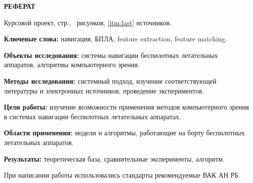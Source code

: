 \begin{center}
  \large\bfseries{РЕФЕРАТ}
\end{center}

Курсовой проект, \pageref{LastPage} стр., \totalfigures\ рисунков, \ref{itm:last} источников.

\begin{center}
  \Large{\@jobtitle}
\end{center}

\textbf{Ключевые слова:} навигация, БПЛА, feature extraction, feature matching.

\textbf{Объекты исследования:} системы навигации беспилотных летательных аппаратов, алгоритмы компьютерного зрения.

\textbf{Методы исследования:} системный подход, изучение соответствующей литературы и электронных источников, проведение экспериментов.

\textbf{Цели работы:} изучение возможности применения методов компьютерного зрения в системах навигации беспилотных летательных аппаратах.

\textbf{Области применения:} модели и алгоритмы, работающие на борту беспилотных летательных аппаратов.

\textbf{Результаты:} теоретическая база, сравнительные эксперименты, алгоритм. 

При написании работы использовались стандарты рекомендуемые ВАК АН РБ.

\newpage